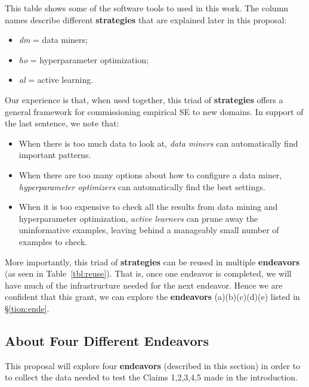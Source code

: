 \documentclass{NSF}
\newenvironment{myitemize}
{ \begin{itemize}
    \setlength{\itemsep}{0pt}
    \setlength{\parskip}{0pt}
    \setlength{\parsep}{0pt}     }
{ \end{itemize}                  }
\newcommand{\bi}{\begin{myitemize}}
\newcommand{\ei}{\end{myitemize}}
\newcommand{\tion}[1]{\S\ref{tion:#1}}
\newcommand{\tbl}[1]{Table~\ref{tbl:#1}}
\begin{document}
\begin{nsfdescription}
This table shows   some of the software tools
to used in this work. 
The column names describe different {\bf strategies} that are explained later in this proposal:
\bi
\item {\em dm} = data miners; 
\item {\em ho} = hyperparameter optimization;
\item {\em al} = active learning.
\ei
Our experience is that,
when used together, this triad of {\bf strategies}
offers a general framework for commissioning
empirical SE to new domains. In support  of
the last sentence,  we note that:
\bi
\item When there is too much data to look at,
{\em data miners} can automatically find important patterns.
\item When there are too many options about how
to configure a data miner, 
{\em hyperparameter optimizers} can automatically find the best settings.
\item 
When it is too expensive to check all the results
from data mining and hyperparameter optimization,
{\em active learners} can prune away the uninformative examples, leaving behind  a manageably
small number of examples to check.
\ei
More importantly, this triad
of {\bf strategies} can be reused
in multiple {\bf endeavors} (as seen in \tbl{reuse}).  That is, 
once one endeavor is completed, we will have much of the infrastructure needed for the next endeavor.
Hence we are confident that  this grant,
we can explore the {\bf endeavors}  (a)(b)(c)(d)(e) 
listed in  \tion{ende}.



\subsection{About Four Different Endeavors}\label{tion:four}
This proposal will explore  four
{\bf endeavors} (described in this section)
in order to 
to collect the data needed to test the  Claims 1,2,3,4,5 made in the introduction. 



\end{nsfdescription}
\end{document}
